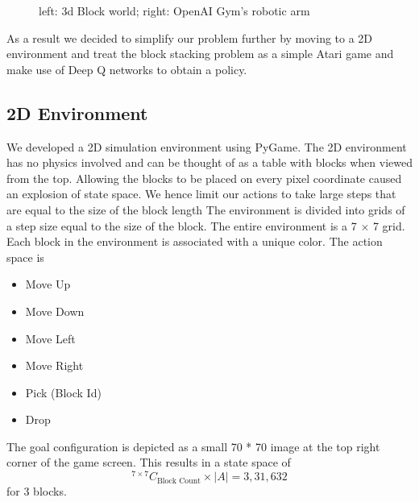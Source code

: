 \documentclass[letterpaper, 12 pt, conference]{ieeeconf}
\begin{document}
\begin{figure}
\caption{left: 3d Block world; right: OpenAI Gym's robotic arm}
\label{preenvs}
\end{figure}

As a result we decided to simplify our problem further by moving to a 2D environment and treat the block stacking problem as a simple Atari game and make use of Deep Q networks to obtain a policy.

\subsection{2D Environment} We developed a 2D simulation environment using PyGame\cite{pygame}. The 2D environment has no physics involved and can be thought of as a table with blocks when viewed from the top. 
Allowing the blocks to be placed on every pixel coordinate caused an explosion of state space. We hence limit our actions to take large steps that are equal to the size of the block length
The environment is divided into grids of a step size equal to the size of the block. The entire environment is a 7 $\times$ 7 grid. Each block in the environment is associated with a unique color. The action space is 

\begin{itemize}
    \item Move Up
    \item Move Down
    \item Move Left
    \item Move Right
    \item Pick (Block Id)
    \item Drop
\end{itemize}
The goal configuration is depicted as a small 70 * 70 image at the top right corner of the game screen.
This results in a state space of $$ ^{7 \times 7}C_{\text{Block Count}} \times |A| = 3,31,632 $$ for 3 blocks.
\end{document}
